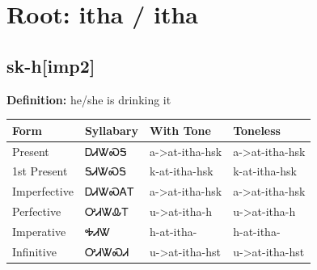 \documentclass{article}%
\begin{document}
%
\normalsize%
\section*{Root: itha / itha}%
\subsection*{sk-h[imp2]}%
\textbf{Definition: }%
he/she is drinking it%
\\[0.5em]%
\begin{tabular}{|l|l|l|l|}%
\hline%
\textbf{Form}&\textbf{Syllabary}&\textbf{With Tone}&\textbf{Toneless}\\%
\hline%
Present&ᎠᏗᏔᏍᎦ&a{-}>at{-}itha{-}hsk&a{-}>at{-}itha{-}hsk\\%
1st Present&ᎦᏗᏔᏍᎦ&k{-}at{-}itha{-}hsk&k{-}at{-}itha{-}hsk\\%
Imperfective&ᎠᏗᏔᏍᎪᎢ&a{-}>at{-}itha{-}hsk&a{-}>at{-}itha{-}hsk\\%
Perfective&ᎤᏗᏔᎲᎢ&u{-}>at{-}itha{-}h&u{-}>at{-}itha{-}h\\%
Imperative&ᎭᏗᏔ&h{-}at{-}itha{-}&h{-}at{-}itha{-}\\%
Infinitive&ᎤᏗᏔᏍᏗ&u{-}>at{-}itha{-}hst&u{-}>at{-}itha{-}hst\\%
\hline%
\end{tabular}%
\\[1em]%
\end{document}
